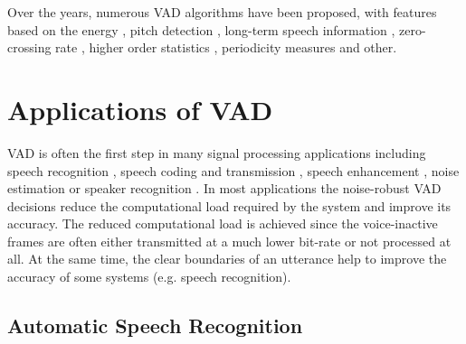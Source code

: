 Over the years, numerous VAD algorithms have been proposed, with features based on the energy \cite{G729, AMR}, pitch detection \cite{PARADE}, long-term speech information \citep{LTSD}, zero-crossing rate \cite{G729Original}, higher order statistics \cite{HOS}, periodicity measures \cite{periodicity} and other.


\section{Applications of VAD}

VAD is often the first step in many signal processing applications including speech recognition \cite{RamirezGorriz, Kuroiwa, Martin, Shafran, ImprovedLikelihood, LTSD}, speech coding and transmission \cite{Sohn, RamirezGorriz, Prasad, G729, GSMControl}, speech enhancement \cite{Park, RamirezGorriz, Borisagar}, noise estimation \cite{RamirezGorriz} or speaker recognition \cite{Sahidullah}. In most applications the noise-robust VAD decisions reduce the computational load required by the system and improve its accuracy. The reduced computational load is achieved since the voice-inactive frames are often either transmitted at a much lower bit-rate or not processed at all. At the same time, the clear boundaries of an utterance help to improve the accuracy of some systems (e.g. speech recognition).

\subsection{Automatic Speech Recognition}

